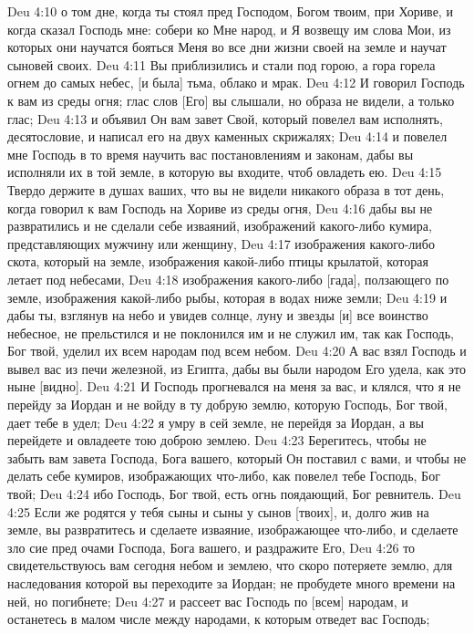 Deu 4:10  о том дне, когда ты стоял пред Господом, Богом твоим, при Хориве, и когда сказал Господь мне: собери ко Мне народ, и Я возвещу им слова Мои, из которых они научатся бояться Меня во все дни жизни своей на земле и научат сыновей своих.
Deu 4:11  Вы приблизились и стали под горою, а гора горела огнем до самых небес, [и была] тьма, облако и мрак.
Deu 4:12  И говорил Господь к вам из среды огня; глас слов [Его] вы слышали, но образа не видели, а только глас;
Deu 4:13  и объявил Он вам завет Свой, который повелел вам исполнять, десятословие, и написал его на двух каменных скрижалях;
Deu 4:14  и повелел мне Господь в то время научить вас постановлениям и законам, дабы вы исполняли их в той земле, в которую вы входите, чтоб овладеть ею.
Deu 4:15  Твердо держите в душах ваших, что вы не видели никакого образа в тот день, когда говорил к вам Господь на Хориве из среды огня,
Deu 4:16  дабы вы не развратились и не сделали себе изваяний, изображений какого-либо кумира, представляющих мужчину или женщину,
Deu 4:17  изображения какого-либо скота, который на земле, изображения какой-либо птицы крылатой, которая летает под небесами,
Deu 4:18  изображения какого-либо [гада], ползающего по земле, изображения какой-либо рыбы, которая в водах ниже земли;
Deu 4:19  и дабы ты, взглянув на небо и увидев солнце, луну и звезды [и] все воинство небесное, не прельстился и не поклонился им и не служил им, так как Господь, Бог твой, уделил их всем народам под всем небом.
Deu 4:20  А вас взял Господь и вывел вас из печи железной, из Египта, дабы вы были народом Его удела, как это ныне [видно].
Deu 4:21  И Господь прогневался на меня за вас, и клялся, что я не перейду за Иордан и не войду в ту добрую землю, которую Господь, Бог твой, дает тебе в удел;
Deu 4:22  я умру в сей земле, не перейдя за Иордан, а вы перейдете и овладеете тою доброю землею.
Deu 4:23  Берегитесь, чтобы не забыть вам завета Господа, Бога вашего, который Он поставил с вами, и чтобы не делать себе кумиров, изображающих что-либо, как повелел тебе Господь, Бог твой;
Deu 4:24  ибо Господь, Бог твой, есть огнь поядающий, Бог ревнитель.
Deu 4:25  Если же родятся у тебя сыны и сыны у сынов [твоих], и, долго жив на земле, вы развратитесь и сделаете изваяние, изображающее что-либо, и сделаете зло сие пред очами Господа, Бога вашего, и раздражите Его,
Deu 4:26  то свидетельствуюсь вам сегодня небом и землею, что скоро потеряете землю, для наследования которой вы переходите за Иордан; не пробудете много времени на ней, но погибнете;
Deu 4:27  и рассеет вас Господь по [всем] народам, и останетесь в малом числе между народами, к которым отведет вас Господь;
